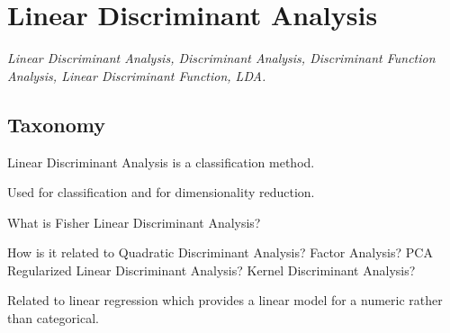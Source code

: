 
\section{Linear Discriminant Analysis} 
\label{sec:lda}

\emph{Linear Discriminant Analysis, Discriminant Analysis, Discriminant Function Analysis, Linear Discriminant Function, LDA.}

\subsection{Taxonomy}
Linear Discriminant Analysis is a classification method.

Used for classification and for dimensionality reduction.

What is Fisher Linear Discriminant Analysis?

How is it related to Quadratic Discriminant Analysis?
Factor Analysis?
PCA
Regularized Linear Discriminant Analysis?
Kernel Discriminant Analysis?

Related to linear regression which provides a linear model for a numeric rather than categorical.



